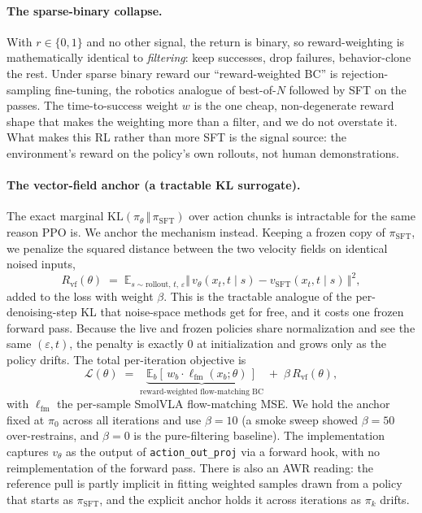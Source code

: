 \documentclass[11pt]{article}
\newcommand{\psft}{\pi_{\mathrm{SFT}}}
\begin{document}
\paragraph{The sparse-binary collapse.}
With $r\in\{0,1\}$ and no other signal, the return is binary, so reward-weighting is
mathematically identical to \emph{filtering}: keep successes, drop failures, behavior-clone the
rest. Under sparse binary reward our ``reward-weighted BC'' is rejection-sampling fine-tuning, the
robotics analogue of best-of-$N$ followed by SFT on the passes. The time-to-success weight $w$ is
the one cheap, non-degenerate reward shape that makes the weighting more than a filter, and we do
not overstate it. What makes this RL rather than more SFT is the signal source: the environment's
reward on the policy's own rollouts, not human demonstrations.

\paragraph{The vector-field anchor (a tractable KL surrogate).}
The exact marginal $\mathrm{KL}(\pi_\theta\,\Vert\,\psft)$ over action chunks is intractable for the
same reason PPO is. We anchor the mechanism instead. Keeping a frozen copy of $\psft$, we penalize
the squared distance between the two velocity fields on identical noised inputs,
\begin{equation}
  R_{\mathrm{vf}}(\theta) \;=\;
  \mathbb{E}_{s\sim\text{rollout},\,t,\,\varepsilon}
  \big\Vert\, v_\theta(x_t,t\mid s) - v_{\mathrm{SFT}}(x_t,t\mid s)\,\big\Vert^2 ,
  \label{eq:rvf}
\end{equation}
added to the loss with weight $\beta$. This is the tractable analogue of the per-denoising-step KL
that noise-space methods get for free, and it costs one frozen forward pass. Because the live and
frozen policies share normalization and see the same $(\varepsilon,t)$, the penalty is exactly $0$
at initialization and grows only as the policy drifts. The total per-iteration objective is
\begin{equation}
  \mathcal{L}(\theta) \;=\;
  \underbrace{\mathbb{E}_b\!\left[\, w_b \cdot \ell_{\mathrm{fm}}(x_b;\theta)\,\right]}_{\text{reward-weighted flow-matching BC}}
  \;+\; \beta\, R_{\mathrm{vf}}(\theta),
  \label{eq:loss}
\end{equation}
with $\ell_{\mathrm{fm}}$ the per-sample SmolVLA flow-matching MSE. We hold the anchor fixed at
$\pi_0$ across all iterations and use $\beta=10$ (a smoke sweep showed $\beta=50$ over-restrains,
and $\beta=0$ is the pure-filtering baseline). The implementation captures $v_\theta$ as the output
of \texttt{action\_out\_proj} via a forward hook, with no reimplementation of the forward pass.
There is also an AWR reading: the reference pull is partly implicit in fitting weighted samples
drawn from a policy that starts as $\psft$, and the explicit anchor holds it across iterations as
$\pi_k$ drifts.
\end{document}
